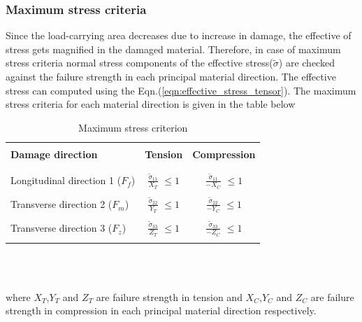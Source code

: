 \documentclass[a4paper,12pt]{extarticle}
\begin{document}
\subsubsection{Maximum stress criteria}
\indent\indent\indent Since the load-carrying area decreases due to increase in damage, the effective of stress gets magnified in the damaged material. Therefore, in case of maximum stress criteria normal stress components of the effective stress($\tilde{\sigma}$) are checked against the failure strength in each principal material direction. The effective stress can computed using the Eqn.(\ref{eqn:effective_stress_tensor}). The maximum stress criteria for each material direction is given in the table below\\
\begin{table}[htbp]
  \begin{center}
     \begin{tabular}{l  c  c} 
     \hline
     \\
      \textbf{Damage direction} \;\;& \textbf{Tension} \;& \textbf{Compression}\\
      \\
      \hline
      \\
      Longitudinal direction 1 ($F_{f}$) & \Large{$\frac{\tilde{\sigma}_{11}}{X_{T}} $}\small{ $\leq 1$} & \Large{$\frac{\tilde{\sigma}_{11}}{-X_{C}} $}\small{ $\leq 1$} \\
      \\
      Transverse direction 2 ($F_{m}$)  &  \Large{$\frac{\tilde{\sigma}_{22}}{Y_{T}} $}\small{ $\leq 1$}  & \Large{$\frac{\tilde{\sigma}_{22}}{-Y_{C}} $}\small{ $\leq 1$}\\
      \\
      Transverse direction 3 ($F_{z}$) &  \Large{$\frac{\tilde{\sigma}_{33}}{Z_{T}} $}\small{ $\leq 1$}  &   \Large{$\frac{\tilde{\sigma}_{33}}{-Z_{C}} $}\small{ $\leq 1$}\\
       \\
       \hline
    \end{tabular}
    \\
    \caption{Maximum stress criterion}
    \label{tab:Maximum stress criterion}
  \end{center}
\end{table}\\
where $X_{T}$,$ Y_{T} $ and $Z_{T}$ are failure strength in tension and $X_{C}$,$ Y_{C} $ and $Z_{C}$ are failure strength in compression in each principal material direction respectively.\\
\\
\end{document}
